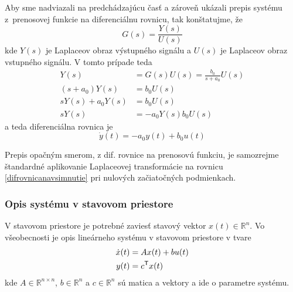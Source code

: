 \documentclass[a4paper, 10pt, ]{article}
\begin{document}
Aby sme nadviazali na predchádzajúcu časť a zároveň ukázali prepis systému z~prenosovej funkcie na diferenciálnu rovnicu, tak konštatujme, že
\begin{equation}
    G(s) = \frac{Y(s)}{U(s)}
\end{equation}
kde $Y(s)$ je Laplaceov obraz výstupného signálu a $U(s)$ je Laplaceov obraz vstupného signálu. V tomto prípade teda
\begin{subequations}
\begin{align}
    Y(s) &= G(s) U(s) = \frac{b_0}{s + a_0} U(s) \\
    \left(s + a_0\right) Y(s) &= b_0 U(s) \\
    s Y(s) + a_0 Y(s) &= b_0 U(s) \\
    s Y(s)  &= -  a_0 Y(s) b_0 U(s) 
\end{align}
\end{subequations}
a teda diferenciálna rovnica je
\begin{equation} \label{difrovnicanavsimnutie}
    \dot y(t) = - a_0 y(t) + b_0 u(t)
\end{equation}

Prepis opačným smerom, z dif. rovnice na prenosovú funkciu, je samozrejme štandardné aplikovanie Laplaceovej transformácie na rovnicu \eqref{difrovnicanavsimnutie} pri nulových začiatočných podmienkach. 





\subsubsection{Opis systému v stavovom priestore}

V stavovom priestore je potrebné zaviesť stavový vektor $x(t) \in \mathbb R^n$. Vo všeobecnosti je opis lineárneho systému v stavovom priestore v tvare
\begin{subequations}
\begin{align}
    \dot x(t) &= A x(t) + b u(t) \\
    y(t) &= c^{\mathsf{T}} x(t) 
\end{align}
\end{subequations}
kde $A \in \mathbb R^{n \times n}$, $b \in \mathbb R^n$ a $c \in \mathbb R^n$ sú matica a vektory a ide o parametre systému. 
\end{document}
